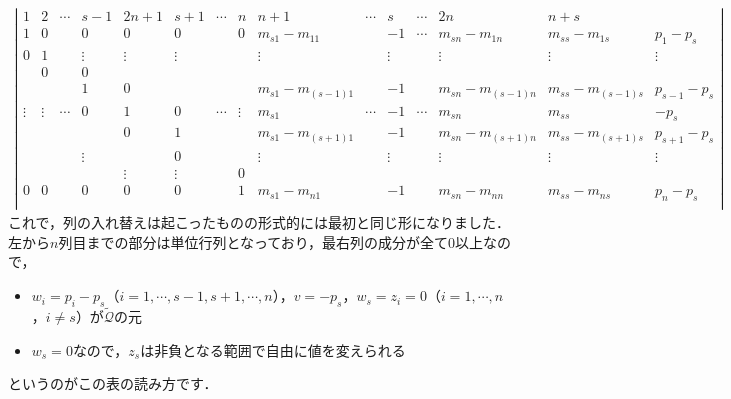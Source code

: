 \documentclass[a4paper]{jsarticle}
\begin{document}
\begin{align*}
\left|\begin{array}{c|c|c|c|c|c|c|c|c|c|c|c|c|c|c}
1      & 2      & \cdots & s-1    & 2n+1   & s+1    & \cdots & n      & n+1            & \cdots & s      & \cdots & 2n             & n+s            & \\
\hline
1      & 0      &        & 0      & 0      & 0      &        & 0      & m_{s1}-m_{11}    &        & -1     & \cdots & m_{sn}-m_{1n}    & m_{ss}-m_{1s}    & p_{1}-p_{s} \\
0      & 1      &        & \vdots & \vdots & \vdots &        &        & \vdots         &        & \vdots &        & \vdots         & \vdots         & \vdots \\
       & 0      &        & 0      &        &        &        &        &                &        &        &        &                &                &        \\
       &        &        & 1      & 0      &        &        &        & m_{s1}-m_{(s-1)1} &        & -1     &        & m_{sn}-m_{(s-1)n} & m_{ss}-m_{(s-1)s} & p_{s-1}-p_{s} \\
\vdots & \vdots & \cdots & 0      & 1      & 0      & \cdots & \vdots & m_{s1}          & \cdots & -1     & \cdots & m_{sn}          & m_{ss}          &-p_{s} \\
       &        &        &        & 0      & 1      &        &        & m_{s1}-m_{(s+1)1} &        & -1     &        & m_{sn}-m_{(s+1)n} & m_{ss}-m_{(s+1)s} & p_{s+1}-p_{s} \\
       &        &        & \vdots &        & 0      &        &        & \vdots         &        & \vdots &        & \vdots         & \vdots         & \vdots \\
       &        &        &        & \vdots & \vdots &        & 0      &                &        &        &        &                &                &        \\
0      & 0      &        & 0      & 0      & 0      &        & 1      & m_{s1}-m_{n1}    &        & -1     &        & m_{sn}-m_{nn}    & m_{ss}-m_{ns}    & p_{n}-p_{s} \\
\end{array}\right|
\end{align*}
これで，列の入れ替えは起こったものの形式的には最初と同じ形になりました．
左から$n$列目までの部分は単位行列となっており，最右列の成分が全て$0$以上なので，
\begin{itemize}
\item $w_{i}=p_{i}-p_{s}$（$i=1,\cdots,s-1,s+1,\cdots,n$），$v=-p_{s}$，$w_{s}=z_{i}=0$（$i=1,\cdots,n$，$i\neq s$）が$\tilde{\mathcal{Q}}$の元
\item $w_{s}=0$なので，$z_{s}$は非負となる範囲で自由に値を変えられる
\end{itemize}
というのがこの表の読み方です．
\end{document}
